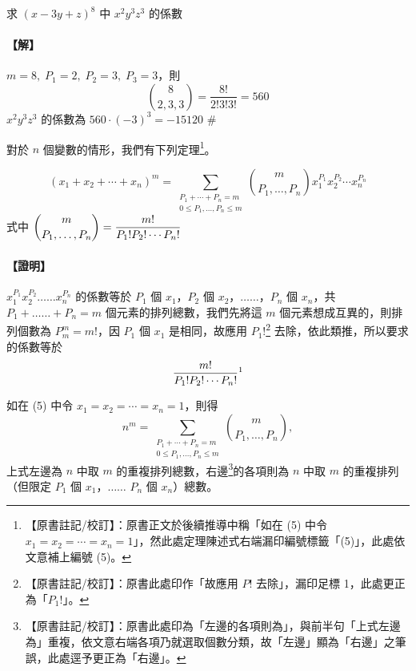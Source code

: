 \medskip
\begin{example}\label{ex:b5s-2-22}
求 $(x - 3y + z)^8$ 中 $x^2 y^3 z^3$ 的係數
\end{example}
\paragraph{【解】}
$m = 8,\; P_1 = 2,\; P_2 = 3,\; P_3 = 3$，則
\[ \binom{8}{2, 3, 3} = \frac{8!}{2! 3! 3!} = 560 \]
$x^2 y^3 z^3$ 的係數為 $560 \cdot (-3)^3 = -15120$ \hfill \#

\bigskip
對於 $n$ 個變數的情形，我們有下列定理\label{note:b5s-ch2-p91-eq5}\footnote{【原書註記/校訂】：原書正文於後續推導中稱「如在 (5) 中令 $x_1 = x_2 = \cdots = x_n = 1$」，然此處定理陳述式右端漏印編號標籤「(5)」，此處依文意補上編號 (5)。}。

\medskip
\begin{theorem}[多項式定理]\label{thm:b5s-2-11}
\begin{equation}
(x_1 + x_2 + \dotsb + x_n)^m = \sum_{\substack{P_1 + \dotsb + P_n = m \\ 0 \le P_1, \dots, P_n \le m}} \binom{m}{P_1, \dots, P_n} x_1^{P_1} x_2^{P_2} \dotsb x_n^{P_n} \label{eq:b5s-2-4-5}\tag{5}
\end{equation}
式中 $\dbinom{m}{P_1, \dots, P_n} = \dfrac{m!}{P_1! P_2! \dotsm P_n!}$
\end{theorem}
\paragraph{【證明】}
$x_1^{P_1} x_2^{P_2} \dots\dots x_n^{P_n}$ 的係數等於 $P_1$ 個 $x_1$，$P_2$ 個 $x_2$，$\dots\dots$，$P_n$ 個 $x_n$，共 $P_1 + \dots\dots + P_n = m$ 個元素的排列總數，我們先將這 $m$ 個元素想成互異的，則排列個數為 $P^m_m = m!$，因 $P_1$ 個 $x_1$ 是相同，故應用 $P_1!$\label{note:b5s-ch2-p91-p1}\footnote{【原書註記/校訂】：原書此處印作「故應用 $P!$ 去除」，漏印足標 1，此處更正為「$P_1!$」。} 去除，依此類推，所以要求的係數等於
\[ \frac{m!}{P_1! P_2! \dotsm P_n!}\footnotemark \]
\label{note:b5s-ch2-p91-pm}

如在 (5) 中令 $x_1 = x_2 = \dotsb = x_n = 1$，則得
\[ n^m = \sum_{\substack{P_1 + \dotsb + P_n = m \\ 0 \le P_1, \dots, P_n \le m}} \binom{m}{P_1, \dots, P_n}, \]
上式左邊為 $n$ 中取 $m$ 的重複排列總數，右邊\label{note:b5s-ch2-p91-right}\footnote{【原書註記/校訂】：原書此處印為「左邊的各項則為」，與前半句「上式左邊為」重複，依文意右端各項乃就選取個數分類，故「左邊」顯為「右邊」之筆誤，此處逕予更正為「右邊」。}的各項則為 $n$ 中取 $m$ 的重複排列（但限定 $P_1$ 個 $x_1$，$\dots\dots$ $P_n$ 個 $x_n$）總數。

